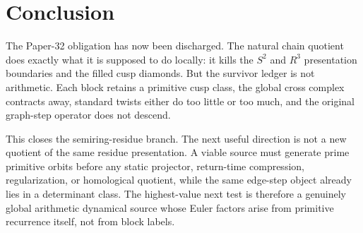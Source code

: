 \section{Conclusion}

The Paper-32 obligation has now been discharged.  The natural chain quotient
does exactly what it is supposed to do locally: it kills the $S^2$ and $R^3$
presentation boundaries and the filled cusp diamonds.  But the survivor ledger
is not arithmetic.  Each block retains a primitive cusp class, the global
cross complex contracts away, standard twists either do too little or too
much, and the original graph-step operator does not descend.

This closes the semiring-residue branch.  The next useful direction is not a
new quotient of the same residue presentation.  A viable source must generate
prime primitive orbits before any static projector, return-time compression,
regularization, or homological quotient, while the same edge-step object
already lies in a determinant class.  The highest-value next test is therefore
a genuinely global arithmetic dynamical source whose Euler factors arise from
primitive recurrence itself, not from block labels.
